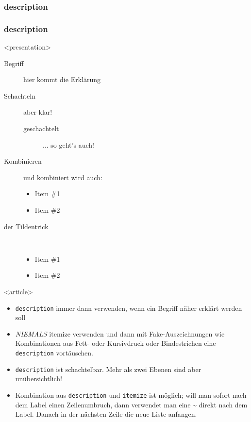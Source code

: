 \subsubsection{description}
\begin{frame}[fragile]
\frametitle<presentation>{description}


\mode
<presentation>
\begin{description}
 \item[Begriff] hier kommt die Erklärung
\item[Schachteln] aber klar!
 \begin{description}
	\item[geschachtelt] ... so geht's auch!
 \end{description}
\item[Kombinieren] und kombiniert wird auch:
 \begin{itemize}
  \item Item \#1
  \item Item \#2
 \end{itemize}
 \item[der Tildentrick]~
 \begin{itemize}
  \item Item \#1
  \item Item \#2
 \end{itemize}
\end{description}


\mode
<article>

\begin{itemize}
 \item \verb+description+ immer dann verwenden, wenn ein Begriff näher erklärt werden soll
 \item \textit{NIEMALS} itemize verwenden und dann mit Fake-Auszeichnungen wie Kombinationen aus Fett- oder Kursivdruck oder Bindestrichen eine \verb+description+ vortäuschen.
 \item \verb+description+ ist schachtelbar. Mehr als zwei Ebenen sind aber unübersichtlich!
 \item Kombination aus \verb+description+ und \verb+itemize+ ist möglich; will man sofort nach dem Label einen Zeilenumbruch, dann verwendet man eine \~{} direkt nach dem Label. Danach in der nächsten Zeile die neue Liste anfangen.
\end{itemize}


\end{frame}
